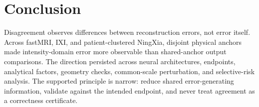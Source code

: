\documentclass[journal,10pt]{IEEEtran}
\begin{document}
\section{Conclusion}
Disagreement observes differences between reconstruction errors, not error itself. Across fastMRI, IXI, and patient-clustered NingXia, disjoint physical anchors made intensity-domain error more observable than shared-anchor output comparisons. The direction persisted across neural architectures, endpoints, analytical factors, geometry checks, common-scale perturbation, and selective-risk analysis. The supported principle is narrow: reduce shared error-generating information, validate against the intended endpoint, and never treat agreement as a correctness certificate.



\end{document}
